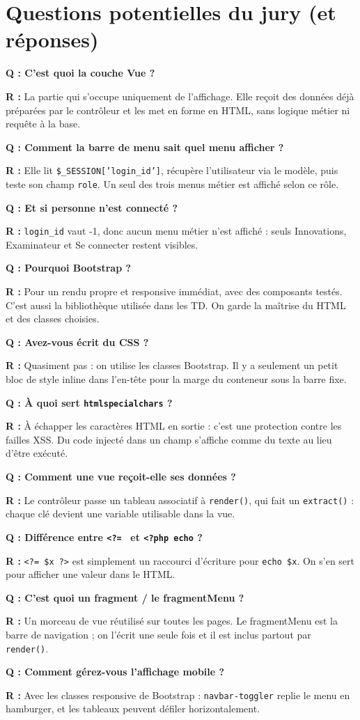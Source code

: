 \documentclass[11pt,a4paper]{article}
\newcommand{\question}[1]{\vspace{0.4em}\noindent\textbf{\color{rouge}Q : #1}\par}
\newcommand{\reponse}[1]{\noindent\textbf{R :} #1\par\vspace{0.4em}}
\begin{document}
\section{Questions potentielles du jury (et réponses)}

\question{C'est quoi la couche Vue ?}
\reponse{La partie qui s'occupe uniquement de l'affichage. Elle reçoit des données
déjà préparées par le contrôleur et les met en forme en HTML, sans logique métier
ni requête à la base.}

\question{Comment la barre de menu sait quel menu afficher ?}
\reponse{Elle lit \texttt{\$\_SESSION['login\_id']}, récupère l'utilisateur via le
modèle, puis teste son champ \texttt{role}. Un seul des trois menus métier est
affiché selon ce rôle.}

\question{Et si personne n'est connecté ?}
\reponse{\texttt{login\_id} vaut -1, donc aucun menu métier n'est affiché : seuls
Innovations, Examinateur et Se connecter restent visibles.}

\question{Pourquoi Bootstrap ?}
\reponse{Pour un rendu propre et responsive immédiat, avec des composants testés.
C'est aussi la bibliothèque utilisée dans les TD. On garde la maîtrise du HTML et
des classes choisies.}

\question{Avez-vous écrit du CSS ?}
\reponse{Quasiment pas : on utilise les classes Bootstrap. Il y a seulement un petit
bloc de style inline dans l'en-tête pour la marge du conteneur sous la barre fixe.}

\question{À quoi sert \texttt{htmlspecialchars} ?}
\reponse{À échapper les caractères HTML en sortie : c'est une protection contre les
failles XSS. Du code injecté dans un champ s'affiche comme du texte au lieu d'être
exécuté.}

\question{Comment une vue reçoit-elle ses données ?}
\reponse{Le contrôleur passe un tableau associatif à \texttt{render()}, qui fait un
\texttt{extract()} : chaque clé devient une variable utilisable dans la vue.}

\question{Différence entre \texttt{<?= } et \texttt{<?php echo} ?}
\reponse{\texttt{<?= \$x ?>} est simplement un raccourci d'écriture pour
\texttt{echo \$x}. On s'en sert pour afficher une valeur dans le HTML.}

\question{C'est quoi un fragment / le fragmentMenu ?}
\reponse{Un morceau de vue réutilisé sur toutes les pages. Le fragmentMenu est la
barre de navigation ; on l'écrit une seule fois et il est inclus partout par
\texttt{render()}.}

\question{Comment gérez-vous l'affichage mobile ?}
\reponse{Avec les classes responsive de Bootstrap : \texttt{navbar-toggler} replie
le menu en hamburger, et les tableaux peuvent défiler horizontalement.}
\end{document}
